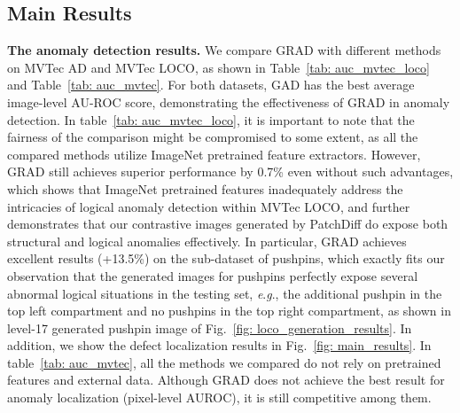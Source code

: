 \documentclass[letterpaper]{article} %
\newcommand{\eg}{\textit{e}.\textit{g}.}
\begin{document}
\begin{table}[htbp]
\centering
\setlength{\belowcaptionskip}{0.0cm}
\setlength{\abovecaptionskip}{0.1cm}
\resizebox{0.9\linewidth}{!}{
\begin{tabular}{lcc}
\toprule
Method & \makecell[c]{Pixel-level\\AU-ROC} & \makecell[c]{Image-level\\AU-ROC} \\ 
\midrule
IGD\tiny{~\citep{IGD}} & 93.1 & 93.4 \\
PSVDD\tiny{~\citep{PSVDD}} & 92.5 & 93.2 \\
FCDD\tiny{~\citep{FCDD}} & 92.1 & 95.7 \\
CutPaste\tiny{~\citep{CutPaste}} & 95.2 & 96.0 \\
NSA\tiny{~\citep{NSA}} & 96.3 & 97.2 \\
DRAEM\tiny{~\citep{DRAEM}} & \textbf{97.3} & 98.0 \\
DSR\tiny{~\citep{DSR}} & - & 98.2 \\
\rowcolor{gray!20} GRAD \tiny{(Ours)} & 96.8 & \textbf{98.7} \\ 
\bottomrule
\end{tabular}}
\caption{Anomaly detection performance on MVTec AD dataset~\cite{MVTecAD}. The best results are in bold.}
\label{tab: auc_mvtec}
\end{table}

\subsection{Main Results}

\noindent\textbf{The anomaly detection results.} We compare GRAD with different methods on MVTec AD and MVTec LOCO, as shown in Table~\ref{tab: auc_mvtec_loco} and Table~\ref{tab: auc_mvtec}. For both datasets, GAD has the best average image-level AU-ROC score, demonstrating the effectiveness of GRAD in anomaly detection. In table~\ref{tab: auc_mvtec_loco}, it is important to note that the fairness of the comparison might be compromised to some extent, as all the compared methods utilize ImageNet pretrained feature extractors. However, GRAD still achieves superior performance by 0.7\% even without such advantages, which shows that ImageNet pretrained features inadequately address the intricacies of logical anomaly detection within MVTec LOCO, and further demonstrates that our contrastive images generated by PatchDiff do expose both structural and logical anomalies effectively. In particular, GRAD achieves excellent results (+13.5\%) on the sub-dataset of pushpins, which exactly fits our observation that the generated images for pushpins perfectly expose several abnormal logical situations in the testing set, \eg, the additional pushpin in the top left compartment and no pushpins in the top right compartment, as shown in level-17 generated pushpin image of Fig.~\ref{fig: loco_generation_results}. In addition, we show the defect localization results in Fig.~\ref{fig: main_results}. In table~\ref{tab: auc_mvtec}, all the methods we compared do not rely on pretrained features and external data. Although GRAD does not achieve the best result for anomaly localization (pixel-level AUROC), it is still competitive among them.
\end{document}

